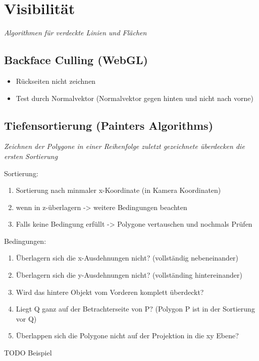 \section{Visibilität}

\textit{Algorithmen für verdeckte Linien und Flächen}

\subsection{Backface Culling (WebGL)}

\begin{itemize}
	\item Rückseiten nicht zeichnen
	\item Test durch Normalvektor (Normalvektor gegen hinten und nicht nach vorne)
\end{itemize}

\subsection{Tiefensortierung (Painters Algorithms)}

\textit{Zeichnen der Polygone in einer Reihenfolge zuletzt gezeichnete überdecken die ersten Sortierung}
 
Sortierung:
\begin{enumerate}
	\item Sortierung nach minmaler x-Koordinate (in Kamera Koordinaten)
	\item wenn in z-überlagern -> weitere Bedingungen beachten
	\item Falls keine Bedingung erfüllt -> Polygone vertauschen und nochmals Prüfen
\end{enumerate}

Bedingungen:
\begin{enumerate}
	\item Überlagern sich die x-Ausdehnungen nicht? (vollständig nebeneinander)
	\item Überlagern sich die y-Ausdehnungen nicht? (vollständing hintereinander)
	\item Wird das hintere Objekt vom Vorderen komplett überdeckt?
	\item Liegt Q ganz auf der Betrachterseite von P? (Polygon P ist in der Sortierung vor Q)
	\item Überlappen sich die Polygone nicht auf der Projektion in die xy Ebene?
\end{enumerate}

TODO Beispiel


